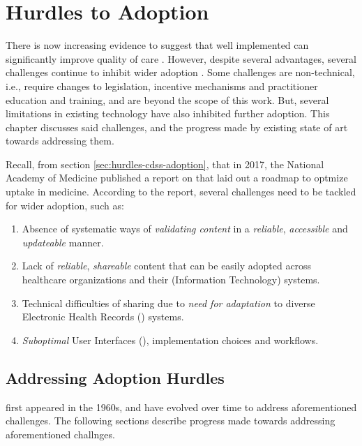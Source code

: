 \chapter{Hurdles to \CDSS{} Adoption}\label{chapter:hurdles-cdss-adoption}

There is now increasing evidence to suggest that
well implemented \CDSSs{} can significantly improve quality of care
\cite{GargJAMA05,WellsEJPC08}. However, despite several advantages,
several challenges continue to inhibit wider \CDSS{} adoption \cite{Nam17}.
Some challenges are non-technical, i.e., require changes to legislation,
incentive mechanisms and practitioner education and training, and are beyond the
scope of this work. But, several limitations in existing \CDSS{} technology have also
inhibited further adoption. This chapter discusses said challenges, and
the progress made by existing state of art towards addressing them.

Recall, from section \ref{sec:hurdles-cdss-adoption}, that in 2017,
the National Academy of Medicine published a report on \CDSSs{} that
laid out a roadmap to optmize \CDSS{} uptake in medicine. According to the
report, several challenges need to be tackled for wider adoption, such as:


\begin{enumerate}[label=C\arabic*.]
\itemsep0.0em
\item Absence of systematic ways of \emph{validating content}
in a \emph{reliable}, \emph{accessible} and \emph{updateable} manner.
\item Lack of \emph{reliable}, \emph{shareable} \CDSS{} content
that can be easily adopted across healthcare organizations and their (Information
Technology) \IT{} systems.
\item Technical difficulties of sharing due to \emph{need for
  adaptation} to diverse Electronic Health Records (\EHR) systems.
\item \emph{Suboptimal} User Interfaces (\UIs), implementation choices and
workflows.
\end{enumerate}

\section{Addressing Adoption Hurdles}\label{sec:addressing-hurdles}

\CDSS{} first appeared in the 1960s, and have evolved over time
to address aforementioned challenges. The following sections
describe progress made towards addressing aforementioned challnges.

